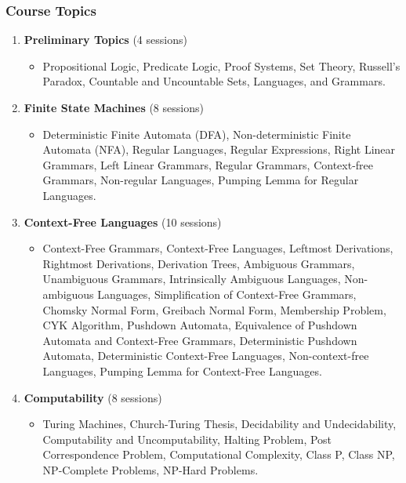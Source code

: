 \documentclass[12pt]{article}
\begin{document}
\subsubsection*{Course Topics}
\begin{enumerate}
    \item \textbf{Preliminary Topics} (4 sessions)
    \begin{itemize}
        \item Propositional Logic, Predicate Logic, Proof Systems, Set Theory, Russell's Paradox, Countable and Uncountable Sets, Languages, and Grammars.
    \end{itemize}
    
    \item \textbf{Finite State Machines} (8 sessions)
    \begin{itemize}
        \item Deterministic Finite Automata (DFA), Non-deterministic Finite Automata (NFA), Regular Languages, Regular Expressions, Right Linear Grammars, Left Linear Grammars, Regular Grammars, Context-free Grammars, Non-regular Languages, Pumping Lemma for Regular Languages.
    \end{itemize}

    \item \textbf{Context-Free Languages} (10 sessions)
    \begin{itemize}
        \item Context-Free Grammars, Context-Free Languages, Leftmost Derivations, Rightmost Derivations, Derivation Trees, Ambiguous Grammars, Unambiguous Grammars, Intrinsically Ambiguous Languages, Non-ambiguous Languages, Simplification of Context-Free Grammars, Chomsky Normal Form, Greibach Normal Form, Membership Problem, CYK Algorithm, Pushdown Automata, Equivalence of Pushdown Automata and Context-Free Grammars, Deterministic Pushdown Automata, Deterministic Context-Free Languages, Non-context-free Languages, Pumping Lemma for Context-Free Languages.
    \end{itemize}

    \item \textbf{Computability} (8 sessions)
    \begin{itemize}
        \item Turing Machines, Church-Turing Thesis, Decidability and Undecidability, Computability and Uncomputability, Halting Problem, Post Correspondence Problem, Computational Complexity, Class P, Class NP, NP-Complete Problems, NP-Hard Problems.
    \end{itemize}
\end{enumerate}
\end{document}
